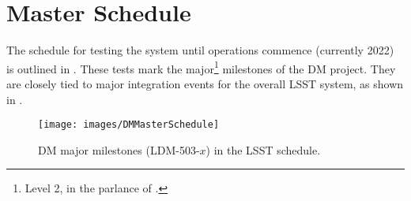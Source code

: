 \section{Master Schedule\label{sect:schedule}}

The schedule for testing the system until operations commence (currently 2022)
is outlined in .
These tests mark the major\footnote{Level 2, in the parlance of .} milestones of the DM project.
They are closely tied to major integration events for the overall LSST system,
as shown in .



\begin{figure}[htbp]
        \begin{center}
                 \texttt{[image: images/DMMasterSchedule]}
                 \caption{DM major milestones (LDM-503-$x$) in the LSST schedule. \label{fig:schedule}}
         \end{center}
 \end{figure}
